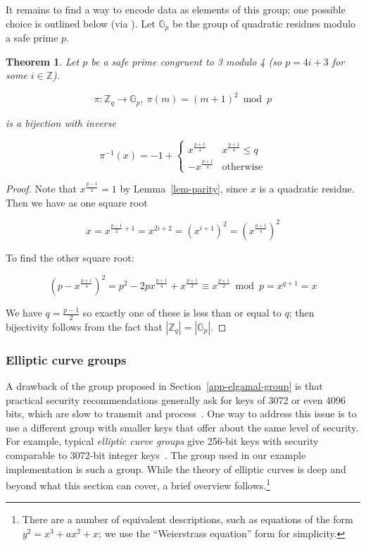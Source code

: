 \documentclass[12pt,a4paper]{article}
\newtheorem{theorem}{Theorem}
\theoremstyle{definition}
\begin{document}
It remains to find a way to encode data as elements of this group; one possible choice is outlined below (via \cite{katz2014introduction}). Let $\mathbb{G}_p$ be the group of quadratic residues modulo a safe prime $p$.
\begin{theorem}
    Let $p$ be a safe prime congruent to 3 modulo 4 (so $p=4i+3$ for some $i\in\mathbb{Z}$).

    $$\pi:\mathbb{Z}_q\rightarrow\mathbb{G}_p,\ \pi(m)=(m+1)^2\bmod p$$

    is a bijection with inverse

    $$\pi^{-1}(x)=-1+\begin{cases}
        x^\frac{p+1}{4} & x^\frac{p+1}{4}\leq q\\
        -x^\frac{p+1}{4}&\text{otherwise}
    \end{cases}$$

\end{theorem}
\begin{proof}
    Note that $x^\frac{p-1}{2}=1$ by Lemma~\ref{lem-parity}, since $x$ is a quadratic residue. Then we have as one square root

    $$x=x^{\frac{p-1}{2}+1}=x^{2i+2}=(x^{i+1})^2=\left(x^\frac{p+1}{4}\right)^2$$

    To find the other square root:

    $$\left(p-x^\frac{p+1}{4}\right)^2=p^2-2px^\frac{p+1}{4}+x^\frac{p+1}{2}\equiv x^\frac{p+1}{2}\bmod p=x^{q+1}=x$$

    We have $q=\frac{p-1}{2}$ so exactly one of these is less than or equal to $q$; then bijectivity follows from the fact that $|\mathbb{Z}_q|=|\mathbb{G}_p|$.



\end{proof}

\subsubsection{Elliptic curve groups}
A drawback of the group proposed in Section~\ref{app-elgamal-group} is that practical security recommendations generally ask for keys of 3072 or even 4096 bits, which are slow to transmit and process~\cite{barker2018transitioning}. One way to address this issue is to use a different group with smaller keys that offer about the same level of security. For example, typical \textit{elliptic curve groups} give 256-bit keys with security comparable to 3072-bit integer keys~\cite{bafandehkar2013comparison}. The group used in our example implementation is such a group. While the theory of elliptic curves is deep and beyond what this section can cover, a brief overview follows.\footnote{There are a number of equivalent descriptions, such as equations of the form $y^2 = x^3 + ax^2 + x$; we use the ``Weierstrass equation'' form for simplicity.}
\end{document}

